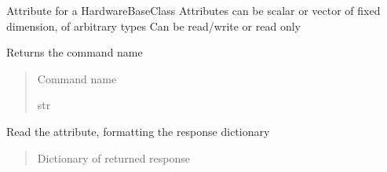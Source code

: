 \documentclass[letterpaper,10pt,english]{sphinxmanual}
\begin{document}
\begin{fulllineitems}
\label{\detokenize{webserverdocs:HardwareBaseClass.HardwareAttribute}}
\pysigstartsignatures
{}
\pysigstopsignatures
\sphinxAtStartPar
Attribute for a HardwareBaseClass
Attributes can be scalar or vector of fixed dimension, of arbitrary types
Can be read/write or read only

\begin{fulllineitems}
\label{\detokenize{webserverdocs:HardwareBaseClass.HardwareAttribute.name}}
\pysigstartsignatures
{}
\pysigstopsignatures
\sphinxAtStartPar
Returns the command name
\begin{quote}\begin{description}
\sphinxAtStartPar
Command name

\sphinxAtStartPar
str

\end{description}\end{quote}

\end{fulllineitems}


\begin{fulllineitems}
\label{\detokenize{webserverdocs:HardwareBaseClass.HardwareAttribute.read}}
\pysigstartsignatures
{}
\pysigstopsignatures
\sphinxAtStartPar
Read the attribute, formatting the response dictionary
\begin{quote}\begin{description}
\sphinxAtStartPar
Dictionary of returned response


\end{description}
\end{quote}
\end{fulllineitems}
\end{fulllineitems}
\end{document}
